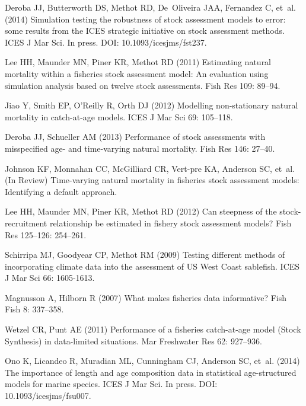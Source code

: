 \documentclass[10pt]{article}
\begin{document}
\begin{thebibliography}{10}
Deroba JJ, Butterworth DS, Methot RD, De~Oliveira JAA, Fernandez C, et~al. (2014)
  Simulation testing the robustness of stock assessment models to error: some
  results from the {ICES} strategic initiative on stock assessment methods.
\newblock ICES J Mar Sci. In press. DOI: 10.1093/icesjms/fst237.

Lee HH, Maunder MN, Piner KR, Methot RD (2011) Estimating natural mortality
  within a fisheries stock assessment model: An evaluation using simulation
  analysis based on twelve stock assessments.
\newblock Fish Res 109: 89--94.

Jiao Y, Smith EP, O'Reilly R, Orth DJ (2012) Modelling non-stationary natural
  mortality in catch-at-age models.
\newblock ICES J Mar Sci 69: 105--118.

Deroba JJ, Schueller AM (2013) Performance of stock assessments with
  misspecified age- and time-varying natural mortality.
\newblock Fish Res 146: 27--40.

Johnson KF, Monnahan CC, McGilliard CR, Vert-pre KA, Anderson SC, et~al. (In Review)
  Time-varying natural mortality in fisheries stock assessment models:
  Identifying a default approach.

Lee HH, Maunder MN, Piner KR, Methot RD (2012) Can steepness of the
  stock-recruitment relationship be estimated in fishery stock assessment
  models?
\newblock Fish Res 125--126: 254--261.

Schirripa MJ, Goodyear CP, Methot RM (2009) Testing different methods of
  incorporating climate data into the assessment of {US West Coast} sablefish.
\newblock ICES J Mar Sci 66: 1605-1613.

Magnusson A, Hilborn R (2007) What makes fisheries data informative?
\newblock Fish Fish 8: 337--358.

Wetzel CR, Punt AE (2011) Performance of a fisheries catch-at-age model ({Stock
  Synthesis}) in data-limited situations.
\newblock Mar Freshwater Res 62: 927--936.

Ono K, Licandeo R, Muradian ML, Cunningham CJ, Anderson SC, et~al. (2014) The
  importance of length and age composition data in statistical age-structured
  models for marine species.
\newblock ICES J Mar Sci. In press. DOI: 10.1093/icesjms/fsu007.


\end{thebibliography}
\end{document}

